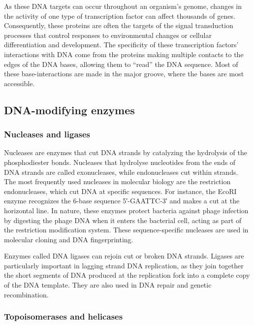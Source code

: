 As these DNA targets can occur throughout an organism's genome, changes in the activity of one type of transcription factor can affect thousands of genes. Consequently, these proteins are often the targets of the signal transduction processes that control responses to environmental changes or cellular differentiation and development. The specificity of these transcription factors' interactions with DNA come from the proteins making multiple contacts to the edges of the DNA bases, allowing them to ``read'' the DNA sequence. Most of these base-interactions are made in the major groove, where the bases are most accessible.

\hypertarget{dna-modifying-enzymes}{%
\subsection{DNA-modifying enzymes}\label{dna-modifying-enzymes}}

\hypertarget{nucleases-and-ligases}{%
\subsubsection{Nucleases and ligases}\label{nucleases-and-ligases}}

Nucleases are enzymes that cut DNA strands by catalyzing the hydrolysis of the phosphodiester bonds. Nucleases that hydrolyse nucleotides from the ends of DNA strands are called exonucleases, while endonucleases cut within strands. The most frequently used nucleases in molecular biology are the restriction endonucleases, which cut DNA at specific sequences. For instance, the EcoRI enzyme recognizes the 6-base sequence 5′-GAATTC-3′ and makes a cut at the horizontal line. In nature, these enzymes protect bacteria against phage infection by digesting the phage DNA when it enters the bacterial cell, acting as part of the restriction modification system. These sequence-specific nucleases are used in molecular cloning and DNA fingerprinting.

Enzymes called DNA ligases can rejoin cut or broken DNA strands. Ligases are particularly important in lagging strand DNA replication, as they join together the short segments of DNA produced at the replication fork into a complete copy of the DNA template. They are also used in DNA repair and genetic recombination.

\hypertarget{topoisomerases-and-helicases}{%
\subsubsection{Topoisomerases and helicases}\label{topoisomerases-and-helicases}}

